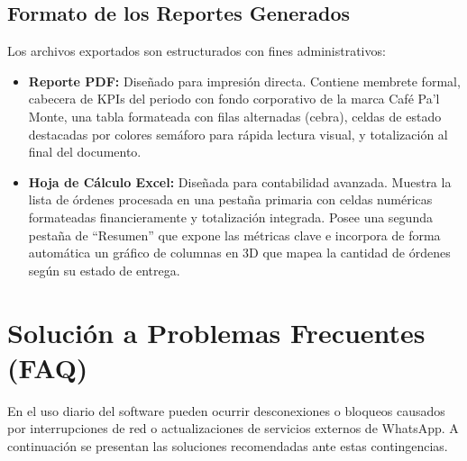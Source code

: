 \documentclass[11pt,a4paper]{article}
\begin{document}
\subsection{Formato de los Reportes Generados}
Los archivos exportados son estructurados con fines administrativos:
\begin{itemize}
    \item \textbf{Reporte PDF:} Diseñado para impresión directa. Contiene membrete formal, cabecera de KPIs del periodo con fondo corporativo de la marca Café Pa'l Monte, una tabla formateada con filas alternadas (cebra), celdas de estado destacadas por colores semáforo para rápida lectura visual, y totalización al final del documento.
    \item \textbf{Hoja de Cálculo Excel:} Diseñada para contabilidad avanzada. Muestra la lista de órdenes procesada en una pestaña primaria con celdas numéricas formateadas financieramente y totalización integrada. Posee una segunda pestaña de ``Resumen'' que expone las métricas clave e incorpora de forma automática un gráfico de columnas en 3D que mapea la cantidad de órdenes según su estado de entrega.
\end{itemize}

\newpage

\section{Solución a Problemas Frecuentes (FAQ)}

En el uso diario del software pueden ocurrir desconexiones o bloqueos causados por interrupciones de red o actualizaciones de servicios externos de WhatsApp. A continuación se presentan las soluciones recomendadas ante estas contingencias.
\end{document}
